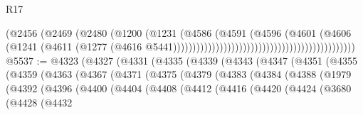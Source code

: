 \begin{lexlean}{R17}
\begin{coremodule}
                                                                      (@2456
                                                                        (@2469
                                                                          (@2480
                                                                            (@1200
                                                                              (@1231
                                                                                (@4586
                                                                                  (@4591
                                                                                    (@4596
                                                                                      (@4601
                                                                                        (@4606
                                                                                          (@1241
                                                                                            (@4611
                                                                                              (@1277
                                                                                                (@4616
                                                                                                  @5441)))))))))))))))))))))))))))))))))))))))))))))))
@5537 := @4323
    (@4327
      (@4331
        (@4335
          (@4339
            (@4343
              (@4347
                (@4351
                  (@4355
                    (@4359
                      (@4363
                        (@4367
                          (@4371
                            (@4375
                              (@4379
                                (@4383
                                  (@4384
                                    (@4388
                                      (@1979
                                        (@4392
                                          (@4396
                                            (@4400
                                              (@4404
                                                (@4408
                                                  (@4412
                                                    (@4416
                                                      (@4420
                                                        (@4424
                                                          (@3680
                                                            (@4428
                                                              (@4432

\end{coremodule}
\end{lexlean}
